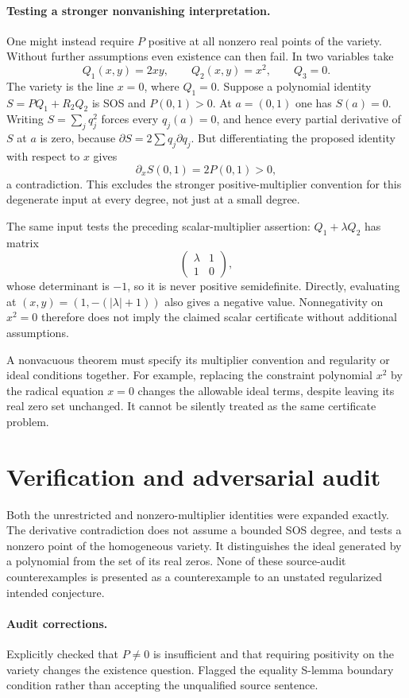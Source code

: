 \documentclass[11pt]{article}
\begin{document}
\paragraph{Testing a stronger nonvanishing interpretation.}
One might instead require $P$ positive at all nonzero real points of the variety. Without further assumptions even existence can then fail. In two variables take
\[
Q_1(x,y)=2xy,\qquad Q_2(x,y)=x^2,\qquad Q_3=0.
\]
The variety is the line $x=0$, where $Q_1=0$. Suppose a polynomial identity $S=PQ_1+R_2Q_2$ is SOS and $P(0,1)>0$. At $a=(0,1)$ one has $S(a)=0$. Writing $S=\sum_j q_j^2$ forces every $q_j(a)=0$, and hence every partial derivative of $S$ at $a$ is zero, because $\partial S=2\sum q_j\partial q_j$. But differentiating the proposed identity with respect to $x$ gives
\[
\partial_x S(0,1)=2P(0,1)>0,
\]
a contradiction. This excludes the stronger positive-multiplier convention for this degenerate input at every degree, not just at a small degree.

The same input tests the preceding scalar-multiplier assertion: $Q_1+\lambda Q_2$ has matrix
\[
\begin{pmatrix}\lambda&1\\1&0\end{pmatrix},
\]
whose determinant is $-1$, so it is never positive semidefinite. Directly, evaluating at $(x,y)=(1,-(|\lambda|+1))$ also gives a negative value. Nonnegativity on $x^2=0$ therefore does not imply the claimed scalar certificate without additional assumptions.

A nonvacuous theorem must specify its multiplier convention and regularity or ideal conditions together. For example, replacing the constraint polynomial $x^2$ by the radical equation $x=0$ changes the allowable ideal terms, despite leaving its real zero set unchanged. It cannot be silently treated as the same certificate problem.
\section{Verification and adversarial audit}
Both the unrestricted and nonzero-multiplier identities were expanded exactly. The derivative contradiction does not assume a bounded SOS degree, and tests a nonzero point of the homogeneous variety. It distinguishes the ideal generated by a polynomial from the set of its real zeros. None of these source-audit counterexamples is presented as a counterexample to an unstated regularized intended conjecture.
\paragraph{Audit corrections.} Explicitly checked that $P\ne0$ is insufficient and that requiring positivity on the variety changes the existence question. Flagged the equality S-lemma boundary condition rather than accepting the unqualified source sentence.
\end{document}
